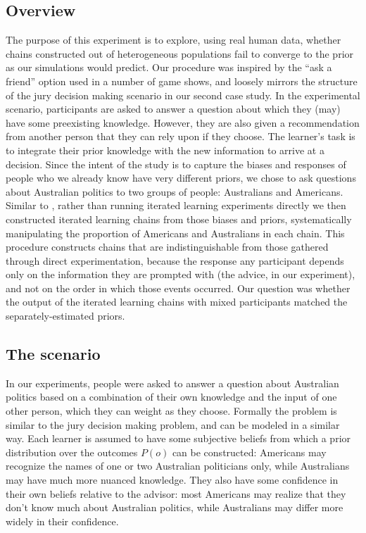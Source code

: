 \documentclass[doc]{apa6}
\begin{document}
\subsection{Overview}

The purpose of this experiment is to explore, using real human data, whether chains constructed out of heterogeneous populations fail to converge to the prior as our simulations would predict. Our procedure was inspired by the ``ask a friend'' option used in a number of game shows, and loosely mirrors the structure of the jury decision making scenario in our second case study. In the experimental scenario, participants are asked to answer a question about which they (may) have some preexisting knowledge. However, they are also given a recommendation from another person that they can rely upon if they choose. The learner's task is to integrate their prior knowledge with the new information to arrive at a decision. Since the intent of the study is to capture the biases and responses of people who we already know have very different priors, we chose to ask questions about Australian politics to two groups of people: Australians and Americans. Similar to \textcite{ferdinandetal13}, rather than running iterated learning experiments directly we then constructed iterated learning chains from those biases and priors, systematically manipulating the proportion of Americans and Australians in each chain. This procedure constructs chains that are indistinguishable from those gathered through direct experimentation, because the response any participant depends only on the information they are prompted with (the advice, in our experiment), and not on the order in which those events occurred. Our question was whether the output of the iterated learning chains with mixed participants matched the separately-estimated priors. 

\subsection{The scenario}

In our experiments, people were asked to answer a question about Australian politics based on a combination of their own knowledge and the input of one other person, which they can weight as they choose. Formally the problem is similar to the jury decision making problem, and can be modeled in a similar way. Each learner is assumed to have some subjective beliefs from which a prior distribution over the outcomes $P(o)$ can be constructed: Americans may recognize the names of one or two Australian politicians only, while Australians may have much more nuanced knowledge. They also have some confidence in their own beliefs relative to the advisor: most Americans may realize that they don't know much about Australian politics, while Australians may differ more widely in their confidence. 
\end{document}
